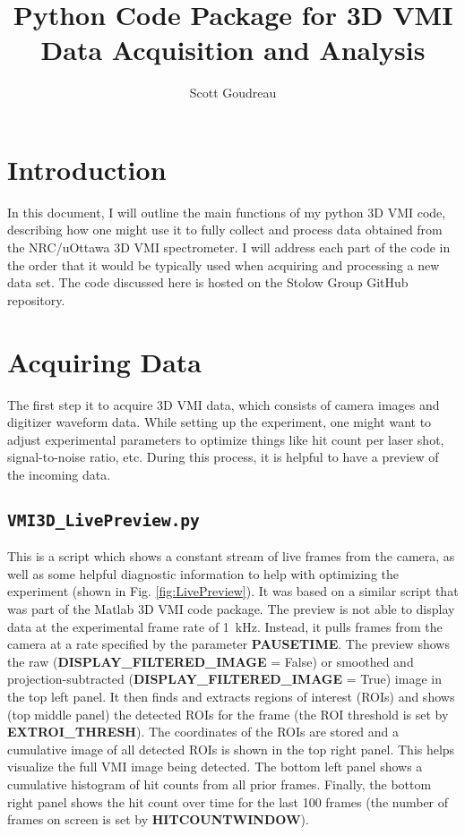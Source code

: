 \documentclass[12pt]{article}
\title{Python Code Package for 3D VMI Data Acquisition and Analysis}
\author{Scott Goudreau}
\begin{document}
\maketitle

\section{Introduction}

In this document, I will outline the main functions of my python 3D VMI code, describing how one might use it to fully collect and process data obtained from the NRC/uOttawa 3D VMI spectrometer.
I will address each part of the code in the order that it would be typically used when acquiring and processing a new data set.
The code discussed here is hosted on the Stolow Group GitHub repository.

\section{Acquiring Data}

The first step it to acquire 3D VMI data, which consists of camera images and digitizer waveform data.
While setting up the experiment, one might want to adjust experimental parameters to optimize things like hit count per laser shot, signal-to-noise ratio, etc.
During this process, it is helpful to have a preview of the incoming data.

\subsection{\texttt{VMI3D\_LivePreview.py}} 

This is a script which shows a constant stream of live frames from the camera, as well as some helpful diagnostic information to help with optimizing the experiment (shown in Fig. \ref{fig:LivePreview}).
It was based on a similar script that was part of the Matlab 3D VMI code package.
The preview is not able to display data at the experimental frame rate of 1~kHz.
Instead, it pulls frames from the camera at a rate specified by the parameter \textbf{PAUSETIME}.
The preview shows the raw (\textbf{DISPLAY\_FILTERED\_IMAGE} = False) or smoothed and projection-subtracted (\textbf{DISPLAY\_FILTERED\_IMAGE} = True) image in the top left panel.
It then finds and extracts regions of interest (ROIs) and shows (top middle panel) the detected ROIs for the frame (the ROI threshold is set by \textbf{EXTROI\_THRESH}).
The coordinates of the ROIs are stored and a cumulative image of all detected ROIs is shown in the top right panel.
This helps visualize the full VMI image being detected.
The bottom left panel shows a cumulative histogram of hit counts from all prior frames.
Finally, the bottom right panel shows the hit count over time for the last 100 frames (the number of frames on screen is set by \textbf{HITCOUNTWINDOW}).
\end{document}
